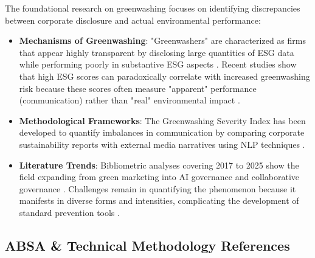 \documentclass{article}
\begin{document}
The foundational research on greenwashing focuses on identifying discrepancies between corporate disclosure and actual environmental performance:
\begin{itemize}
\item 

\textbf{Mechanisms of Greenwashing}: "Greenwashers" are characterized as firms that appear highly transparent by disclosing large quantities of ESG data while performing poorly in substantive ESG aspects  \parencite{ellen_pei_yi_yu_5f63152f}. Recent studies show that high ESG scores can paradoxically correlate with increased greenwashing risk because these scores often measure "apparent" performance (communication) rather than "real" environmental impact  \parencite{manuel_c__kathan_8e56da0e}.\item 

\textbf{Methodological Frameworks}: The Greenwashing Severity Index has been developed to quantify imbalances in communication by comparing corporate sustainability reports with external media narratives using NLP techniques  \parencite{adriana_anamaria_davidescu_cb161cbb}.\item 

\textbf{Literature Trends}: Bibliometric analyses covering 2017 to 2025 show the field expanding from green marketing into AI governance and collaborative governance  \parencite{ge_hu_07a5d67e}. Challenges remain in quantifying the phenomenon because it manifests in diverse forms and intensities, complicating the development of standard prevention tools  \parencite[]{eleni_poiriazi_5f6b9735, agn___neiderien__66378d64}.
\end{itemize}
\subsection*{ABSA \& Technical Methodology References}
\end{document}

